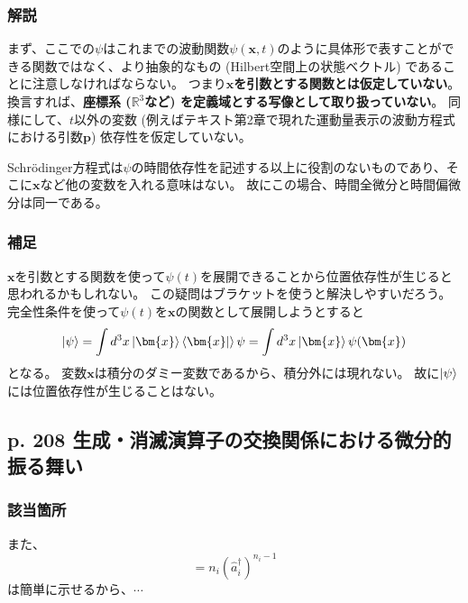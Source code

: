 \documentclass{jsarticle}
\begin{document}
\subsubsection*{解説}

まず、ここでの$\psi$はこれまでの波動関数$\psi(\bm{x},t)$のように具体形で表すことができる関数ではなく、より抽象的なもの (Hilbert空間上の状態ベクトル) であることに注意しなければならない。
つまり\textbf{$\bm{x}$を引数とする関数とは仮定していない}。
換言すれば、\textbf{座標系 ($\mathbb{R}^3$など) を定義域とする写像として取り扱っていない}。
同様にして、$t$以外の変数 (例えばテキスト第2章で現れた運動量表示の波動方程式における引数$\bm{p}$) 依存性を仮定していない。

Schrödinger方程式は$\psi$の時間依存性を記述する以上に役割のないものであり、そこに$\bm{x}$など他の変数を入れる意味はない。
故にこの場合、時間全微分と時間偏微分は同一である。

\subsubsection*{補足}
$\bm{x}$を引数とする関数を使って$\psi(t)$を展開できることから位置依存性が生じると思われるかもしれない。
この疑問はブラケットを使うと解決しやすいだろう。
完全性条件を使って$\psi(t)$を$\bm{x}$の関数として展開しようとすると
\begin{equation*}
    \ket{\psi}
    =
    \int d^3x\ket{\bm{x}}\bra{\bm{x}}\ket\psi
    =
    \int d^3x\ket{\bm{x}}\psi(\bm{x})
\end{equation*}
となる。
変数$\bm{x}$は積分のダミー変数であるから、積分外には現れない。
故に$\ket{\psi}$には位置依存性が生じることはない。


\subsection*{p. 208 生成・消滅演算子の交換関係における微分的振る舞い}

\subsubsection*{該当箇所}

また、
\begin{equation*}
    [\hat{a}_i,(\hat{a}_i^\dagger)^{n_i}]=n_i(\hat{a}_i^\dagger)^{n_i-1}
\end{equation*}
は簡単に示せるから、$\cdots$
\end{document}
